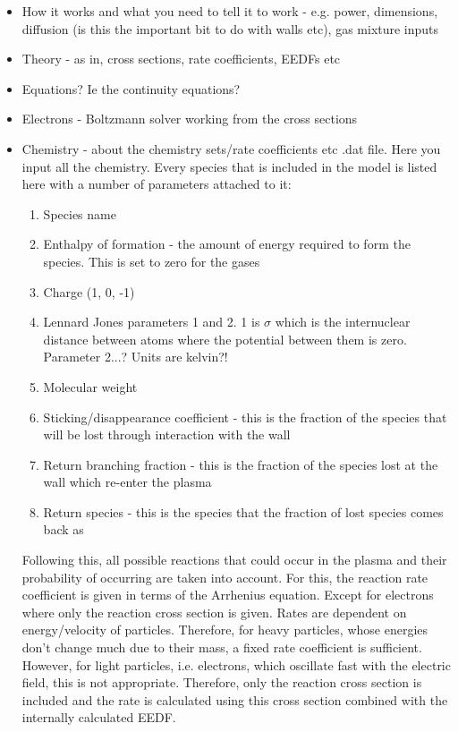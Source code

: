 \documentclass[11pt, oneside]{article}   	%
\begin{document}
\begin{itemize}
\item How it works and what you need to tell it to work - e.g. power, dimensions, diffusion (is this the important bit to do with walls etc), gas mixture inputs
\item Theory - as in, cross sections, rate coefficients, EEDFs etc
\item Equations? Ie the continuity equations?
\item Electrons - Boltzmann solver working from the cross sections
\item Chemistry - about the chemistry sets/rate coefficients etc
.dat file. Here you input all the chemistry. Every species that is included in the model is listed here with a number of parameters attached to it:
\begin{enumerate}
\item Species name
\item Enthalpy of formation - the amount of energy required to form the species. This is set to zero for the gases
\item Charge (1, 0, -1)
\item Lennard Jones parameters 1 and 2. 1 is $\sigma$ which is the internuclear distance between atoms where the potential between them is zero. Parameter 2...? Units are kelvin?!
\item Molecular weight
\item Sticking/disappearance coefficient - this is the fraction of the species that will be lost through interaction with the wall
\item Return branching fraction - this is the fraction of the species lost at the wall which re-enter the plasma
\item Return species - this is the species that the fraction of lost species comes back as
\end{enumerate}
Following this, all possible reactions that could occur in the plasma and their probability of occurring are taken into account. For this, the reaction rate coefficient is given in terms of the Arrhenius equation. Except for electrons where only the reaction cross section is given. Rates are dependent on energy/velocity of particles. Therefore, for heavy particles, whose energies don't change much due to their mass, a fixed rate coefficient is sufficient. However, for light particles, i.e. electrons, which oscillate fast with the electric field, this is not appropriate. Therefore, only the reaction cross section is included and the rate is calculated using this cross section combined with the internally calculated EEDF.

\end{itemize}
\end{document}
